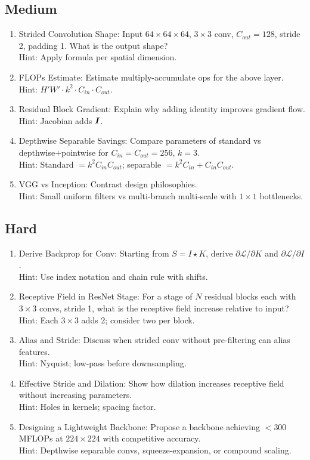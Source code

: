 \subsection*{Medium}
\begin{enumerate}[label=M\arabic*.,leftmargin=*]
    \item Strided Convolution Shape: Input $64\times64\times64$, $3\times3$ conv, $C_{out}=128$, stride 2, padding 1. What is the output shape?\\
    Hint: Apply formula per spatial dimension.
    \item FLOPs Estimate: Estimate multiply-accumulate ops for the above layer.\\
    Hint: $H'W'\cdot k^2\cdot C_{in}\cdot C_{out}$.
    \item Residual Block Gradient: Explain why adding identity improves gradient flow.\\
    Hint: Jacobian adds $\boldsymbol{I}$.
    \item Depthwise Separable Savings: Compare parameters of standard vs depthwise+pointwise for $C_{in}=C_{out}=256$, $k=3$.\\
    Hint: Standard $=k^2 C_{in}C_{out}$; separable $=k^2 C_{in}+C_{in}C_{out}$.
    \item VGG vs Inception: Contrast design philosophies.\\
    Hint: Small uniform filters vs multi-branch multi-scale with $1\times1$ bottlenecks.
\end{enumerate}

\subsection*{Hard}
\begin{enumerate}[label=H\arabic*.,leftmargin=*]
    \item Derive Backprop for Conv: Starting from $S=I\star K$, derive $\partial \mathcal{L}/\partial K$ and $\partial \mathcal{L}/\partial I$.\\
    Hint: Use index notation and chain rule with shifts.
    \item Receptive Field in ResNet Stage: For a stage of $N$ residual blocks each with $3\times3$ convs, stride 1, what is the receptive field increase relative to input?\\
    Hint: Each $3\times3$ adds 2; consider two per block.
    \item Alias and Stride: Discuss when strided conv without pre-filtering can alias features.\\
    Hint: Nyquist; low-pass before downsampling.
    \item Effective Stride and Dilation: Show how dilation increases receptive field without increasing parameters.\\
    Hint: Holes in kernels; spacing factor.
    \item Designing a Lightweight Backbone: Propose a backbone achieving $<300$ MFLOPs at $224\times224$ with competitive accuracy.\\
    Hint: Depthwise separable convs, squeeze-expansion, or compound scaling.
\end{enumerate}

